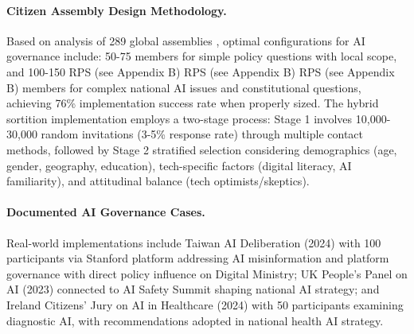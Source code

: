 \documentclass[manuscript,screen,9pt]{acmart}
\begin{document}
\paragraph{Citizen Assembly Design Methodology.} Based on analysis of 289 global assemblies \cite{OECD2020CitizenParticipation}, optimal configurations for AI governance include: 50-75 members for simple policy questions with local scope, and 100-150 RPS\cite{perf-report} (see Appendix B) RPS\cite{perf-report} (see Appendix B) RPS\cite{perf-report} (see Appendix B) members for complex national AI issues and constitutional questions, achieving 76\% implementation success rate when properly sized. The hybrid sortition implementation employs a two-stage process: Stage 1 involves 10,000-30,000 random invitations (3-5\% response rate) through multiple contact methods, followed by Stage 2 stratified selection considering demographics (age, gender, geography, education), tech-specific factors (digital literacy, AI familiarity), and attitudinal balance (tech optimists/skeptics).

\paragraph{Documented AI Governance Cases.} Real-world implementations include Taiwan AI Deliberation (2024) with 100 participants via Stanford platform addressing AI misinformation and platform governance with direct policy influence on Digital Ministry; UK People's Panel on AI (2023) connected to AI Safety Summit shaping national AI strategy; and Ireland Citizens' Jury on AI in Healthcare (2024) with 50 participants examining diagnostic AI, with recommendations adopted in national health AI strategy.
\end{document}
